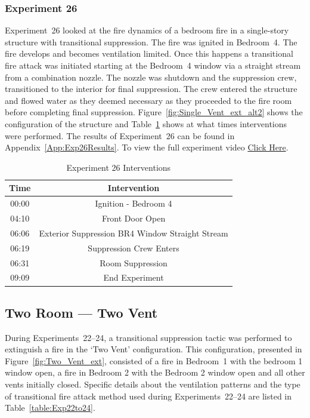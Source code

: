 \documentclass[12pt,oneside]{book}
\begin{document}
\subsubsection{Experiment 26}
Experiment~26 looked at the fire dynamics of a bedroom fire in a single-story structure with transitional suppression. The fire was ignited in Bedroom~4. The fire develops and becomes ventilation limited. Once this happens a transitional fire attack was initiated starting at the Bedroom~4 window via a straight stream from a combination nozzle. The nozzle was shutdown and the suppression crew, transitioned to the interior for final suppression. The crew entered the structure and flowed water as they deemed necessary as they proceeded to the fire room before completing final suppression.  Figure~\ref{fig:Single_Vent_ext_alt2} shows the configuration of the structure and Table~\ref{Table:Exp26Interventions} shows at what times interventions were performed. The results of Experiment~26 can be found in Appendix~\ref{App:Exp26Results}. To view the full experiment video \href{https://player.vimeo.com/video/170499626?autoplay=1}{Click Here}.

\begin{table}[H]
	\centering
	\caption{Experiment 26 Interventions}
	\begin{tabular}{|c|c|} 
		\hline
		Time & Intervention \\ \hline \hline
		00:00 & Ignition - Bedroom 4 \\ \hline
		04:10 & Front Door Open \\ \hline
		06:06 & Exterior Suppression BR4 Window Straight Stream \\ \hline
		06:19 & Suppression Crew Enters\\ \hline
		06:31 & Room Suppression \\ \hline 
		09:09 & End Experiment\\ \hline
	\end{tabular}
	\label{Table:Exp26Interventions}
\end{table}

\clearpage

\subsection{Two Room --- Two Vent}
During Experiments~22--24, a transitional suppression tactic was performed to extinguish a fire in the `Two Vent' configuration. This configuration, presented in Figure~\ref{fig:Two_Vent_ext}, consisted of a fire in Bedroom~1 with the bedroom 1 window open, a fire in Bedroom 2 with the Bedroom 2 window open and all other vents initially closed. Specific details about the ventilation patterns and the type of transitional fire attack method used during Experiments~22--24 are listed in Table~\ref{table:Exp22to24}. 
\end{document}
